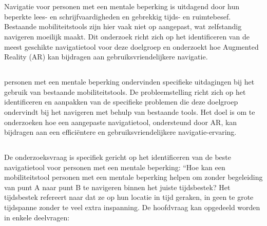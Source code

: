 \chapter{}%
\label{ch:inleiding}
Navigatie voor personen met een mentale beperking is uitdagend door hun beperkte lees- en schrijfvaardigheden en gebrekkig tijds- en ruimtebesef. Bestaande mobiliteitstools zijn hier vaak niet op aangepast, wat zelfstandig navigeren moeilijk maakt. Dit onderzoek richt zich op het identificeren van de meest geschikte navigatietool voor deze doelgroep en onderzoekt hoe Augmented Reality (AR) kan bijdragen aan gebruiksvriendelijkere navigatie.

\section{}%
\label{sec:probleemstelling}

personen met een mentale beperking ondervinden specifieke uitdagingen bij het gebruik van bestaande mobiliteitstools. De probleemstelling richt zich op het identificeren en aanpakken van de specifieke problemen die deze doelgroep ondervindt bij het navigeren met behulp van bestaande tools. Het doel is om te onderzoeken hoe een aangepaste navigatietool, ondersteund door AR, kan bijdragen aan een efficiëntere en gebruiksvriendelijkere navigatie-ervaring.

\section{}%
\label{sec:onderzoeksvraag}

De onderzoeksvraag is specifiek gericht op het identificeren van de beste navigatietool voor personen met een mentale beperking: ``Hoe kan een mobiliteitstool personen met een mentale beperking helpen om zonder begeleiding van punt A naar punt B te navigeren binnen het juiste tijdsbestek? Het tijdsbestek refereert naar dat ze op hun locatie in tijd geraken, in geen te grote tijdspanne zonder te veel extra inspanning. De hoofdvraag kan opgedeeld worden in enkele deelvragen:


